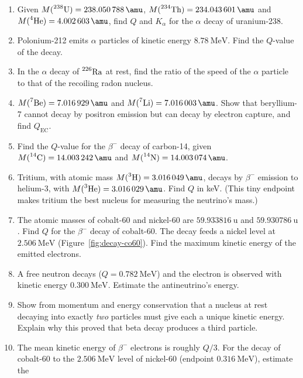 \begin{enumerate}[itemsep=3pt]
\item\label{prob:decay-u238a} Given $M(\iso{238}{U})=\SI{238.050788}{\amu}$, $M(\iso{234}{Th})=\SI{234.043601}{\amu}$
      and $M(\iso4{He})=\SI{4.002603}{\amu}$, find $Q$ and $K_\alpha$ for the $\alpha$ decay of uranium-238.
\item\label{prob:decay-po212} Polonium-212 emits $\alpha$ particles of kinetic energy $\SI{8.78}{\MeV}$.
      Find the $Q$-value of the decay.
\item\label{prob:decay-vratio} In the $\alpha$ decay of $\prescript{226}{}{\mathrm{Ra}}$ at rest, find the ratio of the speed of
      the $\alpha$ particle to that of the recoiling radon nucleus.
\item\label{prob:decay-be7} $M(\iso7{Be})=\SI{7.016929}{\amu}$ and $M(\iso7{Li})=\SI{7.016003}{\amu}$. Show that
      beryllium-7 cannot decay by positron emission but can decay by electron capture, and find
      $Q_{\mathrm{EC}}$.
\item\label{prob:decay-c14q} Find the $Q$-value for the $\beta^-$ decay of carbon-14, given
      $M(\iso{14}{C})=\SI{14.003242}{\amu}$ and $M(\iso{14}{N})=\SI{14.003074}{\amu}$.
\item\label{prob:decay-trit} Tritium, with atomic mass $M(\iso3{H})=\SI{3.016049}{\amu}$, decays by $\beta^-$
      emission to helium-3, with $M(\iso3{He})=\SI{3.016029}{\amu}$. Find $Q$ in keV. (This tiny
      endpoint makes tritium the best nucleus for measuring the neutrino's mass.)
\item\label{prob:decay-co60} The atomic masses of cobalt-60 and nickel-60 are $\SI{59.933816}{\amu}$ and
      $\SI{59.930786}{\amu}$. Find $Q$ for the $\beta^-$ decay of cobalt-60. The decay feeds a nickel level at $\SI{2.506}{\MeV}$ (Figure~\ref{fig:decay-co60}). Find the
      maximum kinetic energy of the emitted electrons.
\item\label{prob:decay-nde} A free neutron decays ($Q=\SI{0.782}{\MeV}$) and the electron is observed with
      kinetic energy $\SI{0.300}{\MeV}$. Estimate the antineutrino's energy.
\item\label{prob:decay-twobody} Show from momentum and energy conservation that a nucleus at rest decaying
      into exactly \emph{two} particles must give each a unique kinetic energy. Explain why this proved that
      beta decay produces a third particle.
\item\label{prob:decay-mean} The mean kinetic energy of $\beta^-$ electrons is roughly $Q/3$. For the decay of
      cobalt-60 to the $\SI{2.506}{\MeV}$ level of nickel-60 (endpoint $\SI{0.316}{\MeV}$), estimate the

\end{enumerate}
